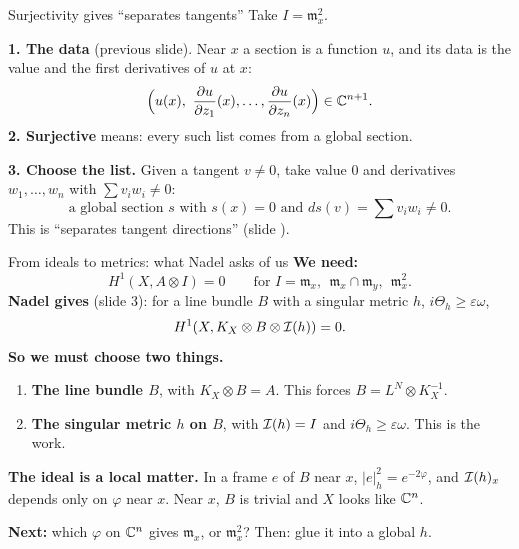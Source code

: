 \begin{frame}{Surjectivity gives ``separates tangents''}
\label{fr:surj-tangents}
Take \(I=\mathfrak m_x^2\).
\par\medskip
\textbf{1. The data} (previous slide). Near \(x\) a section is a function \(u\), and its data is the value and the first derivatives of \(u\) at \(x\):
\[
\Bigl(u(x),\ \frac{\partial u}{\partial z_1}(x),\ldots,\frac{\partial u}{\partial z_n}(x)\Bigr)\in\mathbb C^{n+1}.
\]
\textbf{2. Surjective} means: every such list comes from a global section.
\par\medskip
\textbf{3. Choose the list.} Given a tangent \(v\ne0\), take value \(0\) and derivatives \(w_1,\ldots,w_n\) with \(\sum v_iw_i\ne0\):
\[
\boxed{\text{a global section } s \text{ with } s(x)=0 \text{ and } ds(v)=\textstyle\sum v_iw_i\ne0.}
\]
This is ``separates tangent directions'' (slide \hyperlink{fr:immersion}{\pageref{fr:immersion}}).
\end{frame}





\begin{frame}{From ideals to metrics: what Nadel asks of us}
\label{fr:bridge}
\textbf{We need:}
\[
H^1(X,A\otimes I)=0\qquad\text{for } I=\mathfrak m_x,\ \ \mathfrak m_x\cap\mathfrak m_y,\ \ \mathfrak m_x^2 .
\]
\textbf{Nadel gives} (slide 3): for a line bundle \(B\) with a singular metric \(h\), \(i\Theta_h\ge\varepsilon\omega\),
\[
H^1(X,K_X\otimes B\otimes\mathcal I(h))=0 .
\]
\textbf{So we must choose two things.}
\begin{enumerate}
\setlength{\itemsep}{5pt}
\item \textbf{The line bundle \(B\)}, with \(K_X\otimes B=A\). This forces \(B=L^N\otimes K_X^{-1}\).
\item \textbf{The singular metric \(h\) on \(B\)}, with \(\mathcal I(h)=I\) and \(i\Theta_h\ge\varepsilon\omega\). This is the work.
\end{enumerate}
\par\medskip
\textbf{The ideal is a local matter.} In a frame \(e\) of \(B\) near \(x\), \(|e|_h^2=e^{-2\varphi}\), and \(\mathcal I(h)_x\) depends only on \(\varphi\) near \(x\). Near \(x\), \(B\) is trivial and \(X\) looks like \(\mathbb C^n\).
\par\medskip
\textbf{Next:} which \(\varphi\) on \(\mathbb C^n\) gives \(\mathfrak m_x\), or \(\mathfrak m_x^2\)? Then: glue it into a global \(h\).
\end{frame}


